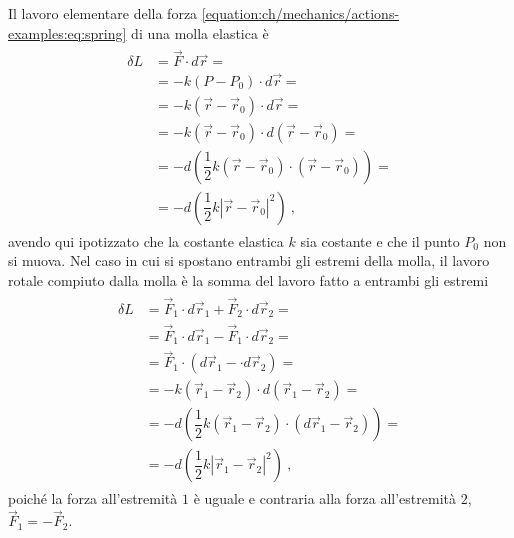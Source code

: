 \documentclass[letterpaper,10pt,italian]{jupyterBook}
\begin{document}
\sphinxAtStartPar
Il lavoro elementare della forza \eqref{equation:ch/mechanics/actions-examples:eq:spring} di una molla elastica è
\begin{equation*}
\begin{split}\begin{aligned}
 \delta L & = \vec{F} \cdot d \vec{r} = \\
 & = - k (P-P_0) \cdot d \vec{r} = \\
 & = - k (\vec{r} - \vec{r}_0) \cdot d \vec{r} = \\
 & = - k (\vec{r} - \vec{r}_0) \cdot d ( \vec{r} - \vec{r}_0 ) = \\
 & = - d \left( \dfrac{1}{2} k (\vec{r} - \vec{r}_0) \cdot (\vec{r} - \vec{r}_0) \right) = \\
 & = - d \left(  \dfrac{1}{2} k \left| \vec{r} - \vec{r}_0 \right|^2 \right) \ ,
\end{aligned}\end{split}
\end{equation*}
\sphinxAtStartPar
avendo qui ipotizzato che la costante elastica \(k\) sia costante e che il punto \(P_0\) non si muova. Nel caso in cui si spostano entrambi gli estremi della molla, il lavoro rotale compiuto dalla molla è la somma del lavoro fatto a entrambi gli estremi
\begin{equation*}
\begin{split}\begin{aligned}
  \delta L
  & = \vec{F}_1 \cdot d \vec{r}_1 + \vec{F}_2 \cdot d \vec{r}_2 = \\
  & = \vec{F}_1 \cdot d \vec{r}_1 - \vec{F}_1 \cdot d \vec{r}_2 = \\
  & = \vec{F}_1 \cdot \left( d \vec{r}_1 - \cdot d \vec{r}_2 \right) = \\
  & = - k ( \vec{r}_1 - \vec{r}_2 ) \cdot d \left( \vec{r}_1 - \vec{r}_2 \right) = \\
  & = - d \left( \dfrac{1}{2} k ( \vec{r}_1 - \vec{r}_2 ) \cdot \left( d \vec{r}_1 - \vec{r}_2 \right) \right) = \\
  & = - d \left( \dfrac{1}{2} k | \vec{r}_1 - \vec{r}_2 |^2 \right) \ , 
\end{aligned}\end{split}
\end{equation*}
\sphinxAtStartPar
poiché la forza all’estremità \(1\) è uguale e contraria alla forza all’estremità \(2\), \(\vec{F}_1 = - \vec{F}_2\).
\end{document}
